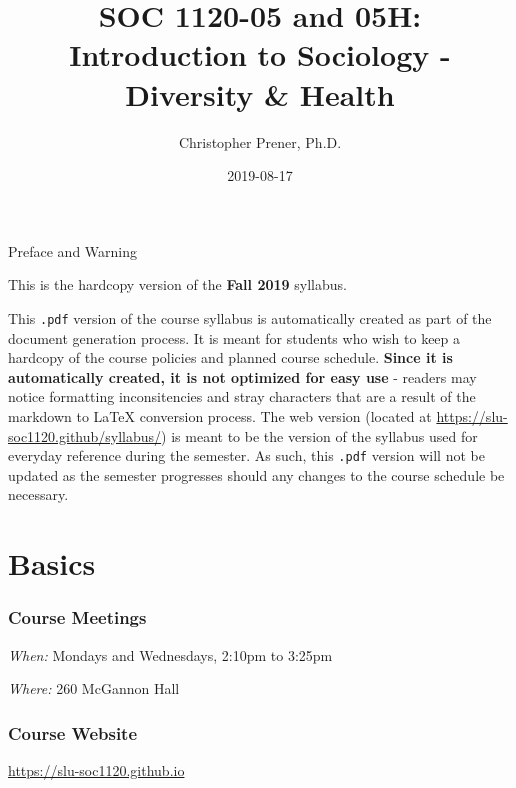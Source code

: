 \documentclass[]{book}
\title{SOC 1120-05 and 05H: Introduction to Sociology - Diversity \& Health}
\author{Christopher Prener, Ph.D.}
\date{2019-08-17}
\begin{document}
\maketitle

\begin{center}
{\huge Preface and Warning} \\
\end{center}
\vspace{5mm}
This is the hardcopy version of the \textbf{Fall 2019} syllabus.
\vspace{5mm}
\par \noindent This \texttt{.pdf} version of the course syllabus is automatically created as part of the document generation process. It is meant for students who wish to keep a hardcopy of the course policies and planned course schedule. \textbf{Since it is automatically created, it is not optimized for easy use} - readers may notice formatting inconsitencies and stray characters that are a result of the markdown to \LaTeX{} conversion process. The web version (located at \href{https://slu-soc1120.github/syllabus/}{https://slu-soc1120.github/syllabus/}) is meant to be the version of the syllabus used for everyday reference during the semester. As such, this \texttt{.pdf} version will not be updated as the semester progresses should any changes to the course schedule be necessary.

\hypertarget{basics}{%
\chapter*{Basics}\label{basics}}

\hypertarget{course-meetings}{%
\subsection*{Course Meetings}\label{course-meetings}}

\emph{When:} Mondays and Wednesdays, 2:10pm to 3:25pm

\emph{Where:} 260 McGannon Hall

\hypertarget{course-website}{%
\subsection*{Course Website}\label{course-website}}

\url{https://slu-soc1120.github.io}
\end{document}
